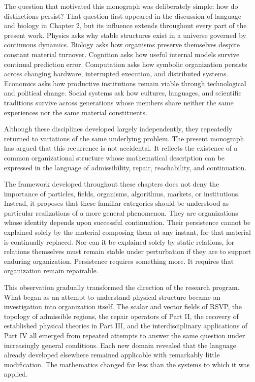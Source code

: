 \documentclass[11pt,oneside]{book}
\numberwithin{equation}{chapter}
\theoremstyle{definition}
\theoremstyle{plain}
\begin{document}
The question that motivated this monograph was deliberately simple: how do distinctions persist? That question first appeared in the discussion of language and biology in
Chapter 2, but its influence extends throughout every part of the present
work. Physics asks why stable structures exist in a universe governed by
continuous dynamics. Biology asks how organisms preserve themselves despite
constant material turnover. Cognition asks how useful internal models
survive continual prediction error. Computation asks how symbolic
organization persists across changing hardware, interrupted execution, and
distributed systems. Economics asks how productive institutions remain
viable through technological and political change. Social systems ask how
cultures, languages, and scientific traditions survive across generations
whose members share neither the same experiences nor the same material
constituents.

Although these disciplines developed largely independently, they
repeatedly returned to variations of the same underlying problem. The
present monograph has argued that this recurrence is not accidental. It
reflects the existence of a common organizational structure whose
mathematical description can be expressed in the language of
admissibility, repair, reachability, and continuation.

The framework developed throughout these chapters does not deny the
importance of particles, fields, organisms, algorithms, markets, or
institutions. Instead, it proposes that these familiar categories should be
understood as particular realizations of a more general phenomenon. They
are organizations whose identity depends upon successful continuation.
Their persistence cannot be explained solely by the material composing
them at any instant, for that material is continually replaced. Nor can it
be explained solely by static relations, for relations themselves must
remain stable under perturbation if they are to support enduring
organization. Persistence requires something more. It requires that
organization remain repairable.

This observation gradually transformed the direction of the research
program. What began as an attempt to understand physical structure became
an investigation into organization itself. The scalar and vector fields of
RSVP, the topology of admissible regions, the repair operators of Part II,
the recovery of established physical theories in Part III, and the
interdisciplinary applications of Part IV all emerged from repeated
attempts to answer the same question under increasingly general
conditions. Each new domain revealed that the language already developed
elsewhere remained applicable with remarkably little modification. The
mathematics changed far less than the systems to which it was applied.
\end{document}
